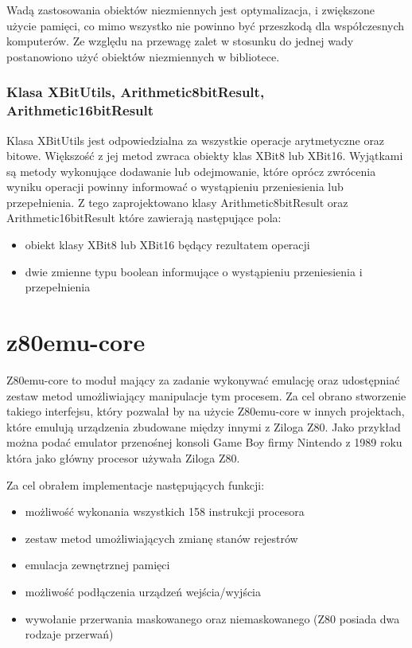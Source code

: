 	Wadą zastosowania obiektów niezmiennych jest optymalizacja, i zwiększone użycie pamięci, co mimo wszystko nie powinno być przeszkodą dla współczesnych komputerów. Ze względu na przewagę zalet w stosunku do jednej wady postanowiono użyć obiektów niezmiennych w bibliotece.
	
	\subsubsection{Klasa XBitUtils, Arithmetic8bitResult, Arithmetic16bitResult}
	Klasa XBitUtils jest odpowiedzialna za wszystkie operacje arytmetyczne oraz bitowe. Większość z jej metod zwraca obiekty klas XBit8 lub XBit16. Wyjątkami są metody wykonujące dodawanie lub odejmowanie, które oprócz zwrócenia wyniku operacji powinny informować o wystąpieniu przeniesienia lub przepełnienia. Z tego zaprojektowano  klasy Arithmetic8bitResult oraz Arithmetic16bitResult które zawierają następujące pola:
	\begin{itemize}
		\item obiekt klasy XBit8 lub XBit16 będący rezultatem operacji
		\item dwie zmienne typu boolean informujące o wystąpieniu przeniesienia i przepełnienia
	\end{itemize}
		
	
	
	\section{z80emu-core}
	Z80emu-core to moduł mający za zadanie wykonywać emulację oraz udostępniać zestaw metod umożliwiający  manipulacje tym procesem. Za cel obrano stworzenie takiego interfejsu, który pozwalał by na użycie Z80emu-core w innych projektach, które emulują urządzenia zbudowane między innymi z Ziloga Z80. Jako przykład można podać emulator przenośnej konsoli Game Boy firmy Nintendo z 1989 roku która jako główny procesor używała Ziloga Z80. 

	Za cel obrałem implementacje następujących funkcji:
	\begin{itemize}  
		\item możliwość wykonania wszystkich 158 instrukcji procesora
		\item zestaw metod umożliwiających zmianę stanów rejestrów
		\item emulacja zewnętrznej pamięci
		\item możliwość podłączenia urządzeń wejścia/wyjścia
		\item wywołanie przerwania maskowanego oraz niemaskowanego (Z80 posiada dwa rodzaje przerwań)
	\end{itemize}
	
